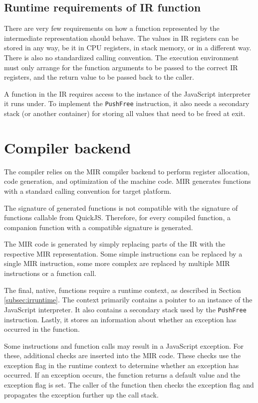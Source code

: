 \subsection{Runtime requirements of IR function}\label{subsec:irruntime}

There are very few requirements on how a function represented by the intermediate representation should behave. The values in IR registers can be stored in any way, be it in CPU registers, in stack memory, or in a different way. There is also no standardized calling convention. The execution environment must only arrange for the function arguments to be passed to the correct IR registers, and the return value to be passed back to the caller.

A function in the IR requires access to the instance of the JavaScript interpreter it runs under. To implement the \texttt{PushFree} instruction, it also needs a secondary stack (or another container) for storing all values that need to be freed at exit.


\section{Compiler backend}

The compiler relies on the MIR compiler backend to perform register allocation, code generation, and optimization of the machine code. MIR generates functions with a standard calling convention for target platform.

The signature of generated functions is not compatible with the signature of functions callable from QuickJS. Therefore, for every compiled function, a companion function with a compatible signature is generated.

The MIR code is generated by simply replacing parts of the IR with the respective MIR representation. Some simple instructions can be replaced by a single MIR instruction, some more complex are replaced by multiple MIR instructions or a function call.

The final, native, functions require a runtime context, as described in Section \ref{subsec:irruntime}. The context primarily contains a pointer to an instance of the JavaScript interpreter. It also contains a secondary stack used by the \texttt{PushFree} instruction. Lastly, it stores an information about whether an exception has occurred in the function.

Some instructions and function calls may result in a JavaScript exception. For these, additional checks are inserted into the MIR code. These checks use the exception flag in the runtime context to determine whether an exception has occurred. If an exception occurs, the function returns a default value and the exception flag is set. The caller of the function then checks the exception flag and propagates the exception further up the call stack.

